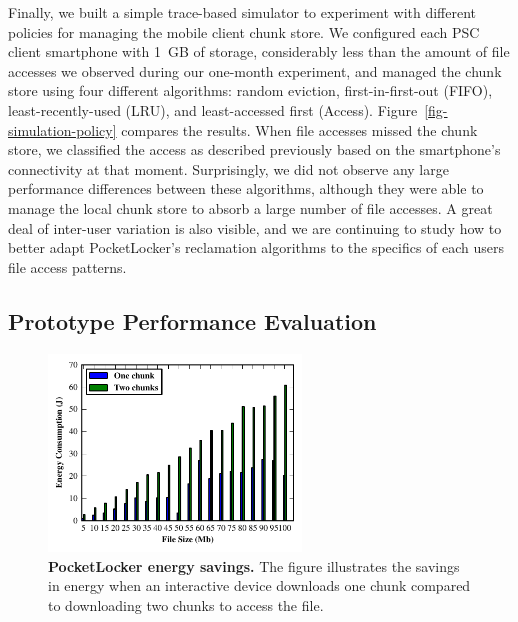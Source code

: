 Finally, we built a simple trace-based simulator to experiment with different
policies for managing the mobile client chunk store. We configured each PSC
client smartphone with 1~GB of storage, considerably less than the amount of
file accesses we observed during our one-month experiment, and managed the
chunk store using four different algorithms: random eviction,
first-in-first-out (FIFO), least-recently-used (LRU), and least-accessed
first (Access). Figure~\ref{fig-simulation-policy} compares the results. When
file accesses missed the chunk store, we classified the access as described
previously based on the smartphone's connectivity at that moment.
Surprisingly, we did not observe any large performance differences between
these algorithms, although they were able to manage the local
chunk store to absorb a large number of file accesses. A great
deal of inter-user variation is also visible, and we are continuing to study
how to better adapt PocketLocker's reclamation algorithms to the specifics of
each users file access patterns.

\subsection{Prototype Performance Evaluation}

\begin{figure}
  
  \vspace*{-0.4in}

  \includegraphics[width=0.6\textwidth]{./figures/energysavings.pdf}
  
  \vspace*{-0.1in}

  \caption{\small \textbf{PocketLocker energy savings.} The figure
    illustrates the savings in energy when an interactive device downloads
  one chunk compared to downloading two chunks to access the file.}
  
  \label{fig-evaluation-energysavings}
  
  \vspace*{-0.2in}

\end{figure}

